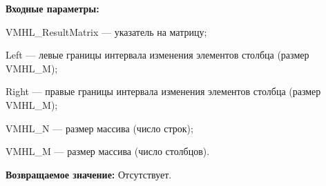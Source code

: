 \textbf{Входные параметры:}

 VMHL\_ResultMatrix --- указатель на матрицу;
 
 Left --- левые границы интервала изменения элементов столбца (размер VMHL\_M);
 
 Right --- правые границы интервала изменения элементов столбца (размер VMHL\_M);
 
 VMHL\_N --- размер массива (число строк);
 
 VMHL\_M --- размер массива (число столбцов).

\textbf{Возвращаемое значение:}
Отсутствует.